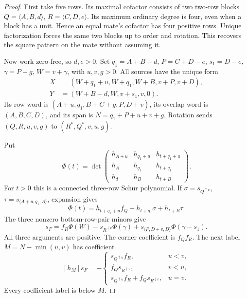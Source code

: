 \documentclass[11pt,a4paper]{amsart}
\numberwithin{equation}{section}
\theoremstyle{plain}
\theoremstyle{definition}
\begin{document}
\begin{proof}
First take five rows.  Its maximal cofactor consists of two two-row blocks
\(Q=\langle A,B,d\rangle\), \(R=\langle C,D,e\rangle\).
Its maximum ordinary degree is four, even when a block has a unit.
Hence an equal mate's cofactor has four positive rows.  Unique
factorization forces the same two blocks up to order and rotation.
This recovers the square pattern on the mate without assuming it.

Now work zero-free, so \(d,e>0\).  Set
\(q_1=A+B-d\), \(P=C+D-e\), \(s_1=D-e\), \(\gamma=P+g\),
\(W=v+\gamma\), with \(u,v,g>0\).  All sources have the unique form
\begin{equation}\label{eq:square-lists}
 \begin{aligned}
 X&=(W+q_1+u,W+q_1,W+B,v+P,v+D),\\
 Y&=(W+B-d,W,v+s_1,v,0).
 \end{aligned}
\end{equation}
Its row word is \((A+u,q_1,B+C+g,P,D+v)\), its overlap word is
\((A,B,C,D)\), and its span is \(N=q_1+P+u+v+g\).
Rotation sends \((Q,R,u,v,g)\) to \((R^*,Q^*,v,u,g)\).

Put
\[
 \Phi(t)=\det\begin{pmatrix}
 h_{A+u}&h_{q_1+u}&h_{t+q_1+u}\\
 h_A&h_{q_1}&h_{t+q_1}\\
 h_d&h_B&h_{t+B}
 \end{pmatrix}.
\]
For \(t>0\) this is a connected three-row Schur polynomial.  If
\(\sigma=s_{Q^{\uparrow u}}\),
\(\tau=s_{\langle A+u,q_1,A\rangle}\), expansion gives
\begin{equation}\label{eq:square-phi}
 \Phi(t)=h_{t+q_1+u}f_Q-h_{t+q_1}\sigma+h_{t+B}\tau.
\end{equation}
The three nonzero bottom-row-pair minors give
\begin{equation}\label{eq:square-star}
 s_F=f_R\Phi(W)-s_{R^{\downarrow v}}\Phi(\gamma)
       +s_{\langle P,D+v,D\rangle}\Phi(\gamma-s_1).
\end{equation}
All three arguments are positive.  The corner coefficient is \(f_Qf_R\).
The next label \(M=N-\min(u,v)\) has coefficient
\begin{equation}\label{eq:square-marker}
 [h_M]s_F=-\begin{cases}
 s_{Q^{\uparrow u}}f_R,&u<v,\\
 f_Qs_{R^{\downarrow v}},&v<u,\\
 s_{Q^{\uparrow u}}f_R+f_Qs_{R^{\downarrow v}},&u=v.
 \end{cases}
\end{equation}
Every coefficient label is below \(M\).


\end{proof}
\end{document}
